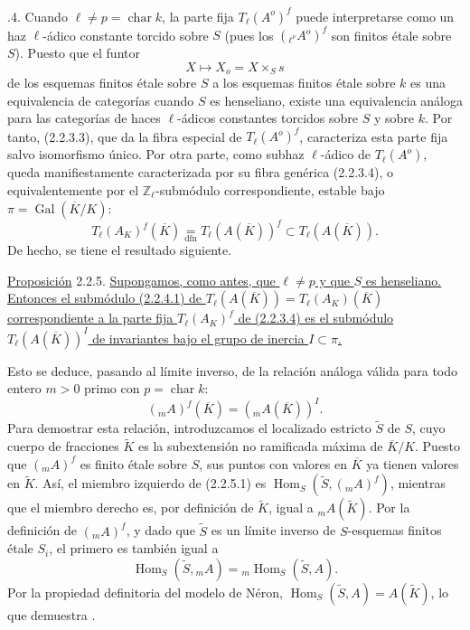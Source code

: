 \medskip
{}.4. Cuando $\ell\ne p=\operatorname{char}k$, la parte fija
$T_\ell(A^o)^f$ puede interpretarse como un haz $\ell$-ádico constante
torcido sobre $S$ (pues los $({}_{\ell^\nu}A^o)^f$ son finitos étale
sobre $S$). Puesto que el funtor
\[
 X\longmapsto X_o=X\times_Ss
\]
de los esquemas finitos étale sobre $S$ a los esquemas finitos étale
sobre $k$ es una equivalencia de categorías cuando $S$ es henseliano,
existe una equivalencia análoga para las categorías de haces
$\ell$-ádicos constantes torcidos sobre $S$ y sobre $k$. Por tanto,
(2.2.3.3), que da la fibra especial de $T_\ell(A^o)^f$, caracteriza
esta parte fija salvo isomorfismo único. Por otra parte, como subhaz
$\ell$-ádico de $T_\ell(A^o)$, queda manifiestamente caracterizada por
su fibra genérica (2.2.3.4), o equivalentemente por el
$\mathbb Z_\ell$-submódulo correspondiente, estable bajo
$\pi=\operatorname{Gal}(\overline K/K)$:
\begin{equation}\tag{2.2.4.1}
 T_\ell(A_K)^f(\overline K)
 \underset{\mathrm{dfn}}{=}T_\ell(A(\overline K))^f
 \subset T_\ell(A(\overline K)).
\end{equation}
De hecho, se tiene el resultado siguiente.

\medskip
\noindent
\underline{Proposición} 2.2.5. \underline{Supongamos, como antes, que
$\ell\ne p$ y que $S$ es henseliano. Entonces el submódulo (2.2.4.1)
de $T_\ell(A(\overline K))=T_\ell(A_K)(\overline K)$ correspondiente a
la parte fija $T_\ell(A_K)^f$ de (2.2.3.4) es el submódulo
$T_\ell(A(\overline K))^I$ de invariantes bajo el grupo de inercia
$I\subset\pi$.}

Esto se deduce, pasando al límite inverso, de la relación análoga
válida para todo entero $m>0$ primo con
$p=\operatorname{char}k$:
\begin{equation}\tag{2.2.5.1}
 ({}_mA)^f(\overline K)=({}_mA(\overline K))^I.
\end{equation}
Para demostrar esta relación, introduzcamos el localizado estricto
$\widetilde S$ de $S$, cuyo cuerpo de fracciones $\widetilde K$ es la
subextensión no ramificada máxima de $\overline K/K$. Puesto que
$({}_mA)^f$ es finito étale sobre $S$, sus puntos con valores en
$\overline K$ ya tienen valores en $\widetilde K$. Así, el miembro
izquierdo de (2.2.5.1) es
$\operatorname{Hom}_S(\widetilde S,({}_mA)^f)$, mientras que el miembro
derecho es, por definición de $\widetilde K$, igual a
${}_mA(\widetilde K)$. Por la definición de $({}_mA)^f$, y dado que
$\widetilde S$ es un límite inverso de $S$-esquemas finitos étale
$S_i$, el primero es también igual a
\[
 \operatorname{Hom}_S(\widetilde S,{}_mA)
 ={}_m\operatorname{Hom}_S(\widetilde S,A).
\]
Por la propiedad definitoria del modelo de Néron,
$\operatorname{Hom}_S(\widetilde S,A)=A(\widetilde K)$, lo que
demuestra .


